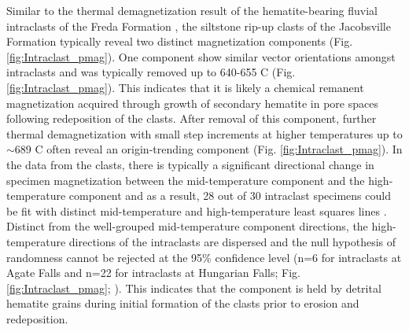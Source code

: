 \documentclass[draft]{agujournal2019}
\begin{document}
Similar to the thermal demagnetization result of the hematite-bearing fluvial intraclasts of the Freda Formation \cite{Swanson-Hysell2019b}, the siltstone rip-up clasts of the Jacobsville Formation typically reveal two distinct magnetization components (Fig. \ref{fig:Intraclast_pmag}). One component show similar vector orientations amongst intraclasts and was typically removed up to 640-655 \textdegree C (Fig. \ref{fig:Intraclast_pmag}). This indicates that it is likely a chemical remanent magnetization acquired through growth of secondary hematite in pore spaces following redeposition of the clasts. After removal of this component, further thermal demagnetization with small step increments at higher temperatures up to $\sim$689 \textdegree C often reveal an origin-trending component (Fig. \ref{fig:Intraclast_pmag}). In the data from the clasts, there is typically a significant directional change in specimen magnetization between the mid-temperature component and the high-temperature component and as a result, 28 out of 30 intraclast specimens could be fit with distinct mid-temperature and high-temperature least squares lines \cite{Kirschvink1980a}. Distinct from the well-grouped mid-temperature component directions, the high-temperature directions of the intraclasts are dispersed and the null hypothesis of randomness cannot be rejected at the 95\% confidence level (n=6 for intraclasts at Agate Falls and n=22 for intraclasts at Hungarian Falls; Fig. \ref{fig:Intraclast_pmag}; ). This indicates that the component is held by detrital hematite grains during initial formation of the clasts prior to erosion and redeposition. 
\end{document}
